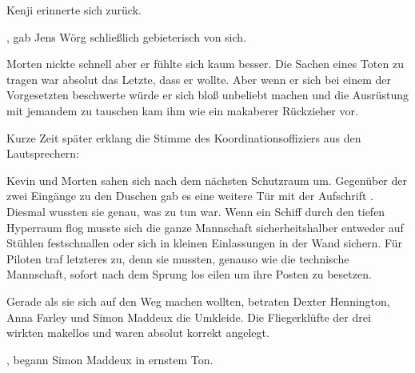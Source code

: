 Kenji erinnerte sich zurück. 

\par

, gab Jens Wörg schließlich gebieterisch von sich. 

\par

Morten nickte schnell aber er fühlte sich kaum besser. Die Sachen eines Toten zu tragen war absolut das Letzte, dass er wollte. Aber wenn er sich bei einem der Vorgesetzten beschwerte würde er sich bloß unbeliebt machen und die Ausrüstung mit jemandem zu tauschen kam ihm wie ein makaberer Rückzieher vor.

\par

Kurze Zeit später erklang die Stimme des Koordinationsoffiziers aus den Lautsprechern: 

\par

Kevin und Morten sahen sich nach dem nächsten Schutzraum um. Gegenüber der zwei Eingänge zu den Duschen gab es eine weitere Tür mit der Aufschrift . Diesmal wussten sie genau, was zu tun war. Wenn ein Schiff durch den tiefen Hyperraum flog musste sich die ganze Mannschaft sicherheitshalber entweder auf Stühlen festschnallen oder sich in kleinen Einlassungen in der Wand sichern. Für Piloten traf letzteres zu, denn sie mussten, genauso wie die technische Mannschaft, sofort nach dem Sprung los eilen um ihre Posten zu besetzen.

\par

Gerade als sie sich auf den Weg machen wollten, betraten Dexter Hennington, Anna Farley und Simon Maddeux die Umkleide. Die Fliegerklüfte der drei wirkten makellos und waren absolut korrekt angelegt.

\par

, begann Simon Maddeux in ernstem Ton. 

